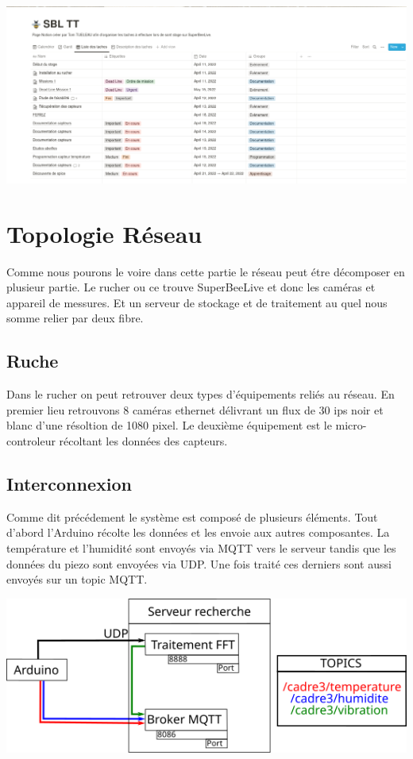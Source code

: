 \documentclass[12pt,french,a4paper]{article}
\begin{document}
\begin{center}	
\includegraphics[scale=0.35]{../img/notionlistesdestaches.png}
\label{Liste des taches}
\end{center}

\section{Topologie Réseau}
Comme nous pourons le voire dans cette partie le réseau peut étre décomposer en plusieur partie. Le rucher ou ce trouve SuperBeeLive et donc les caméras et appareil de messures. Et un serveur de stockage et de traitement au quel nous somme relier par deux fibre. 
\subsection{Ruche}
Dans le rucher on peut retrouver deux types d'équipements reliés au réseau. En premier lieu retrouvons 8 caméras ethernet délivrant un flux de 30 ips noir et blanc d'une résoltion de 1080 pixel. Le deuxième équipement est le micro-controleur récoltant les données des capteurs.  
\subsection{Interconnexion}
Comme dit précédement le système est composé de plusieurs éléments. Tout d'abord l'Arduino récolte les données et les envoie aux autres composantes. La température et l'humidité sont envoyés via MQTT vers le serveur tandis que les données du piezo sont envoyées via UDP. Une fois traité ces derniers sont aussi envoyés sur un topic MQTT.

\begin{center}
    \includegraphics[scale=1]{../img/schemaNet.png}
    \label{SN}
\end{center}
\end{document}
